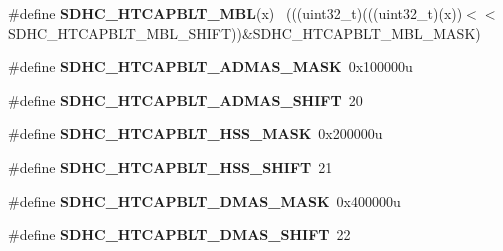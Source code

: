 \begin{DoxyCompactItemize}
\item 
\hypertarget{group___s_d_h_c___register___masks_ga6ce87788b2a2967c6a743dcd610498ba}{}\#define {\bfseries S\+D\+H\+C\+\_\+\+H\+T\+C\+A\+P\+B\+L\+T\+\_\+\+M\+B\+L}(x)                                      ~(((uint32\+\_\+t)(((uint32\+\_\+t)(x))$<$$<$S\+D\+H\+C\+\_\+\+H\+T\+C\+A\+P\+B\+L\+T\+\_\+\+M\+B\+L\+\_\+\+S\+H\+I\+F\+T))\&S\+D\+H\+C\+\_\+\+H\+T\+C\+A\+P\+B\+L\+T\+\_\+\+M\+B\+L\+\_\+\+M\+A\+S\+K)\label{group___s_d_h_c___register___masks_ga6ce87788b2a2967c6a743dcd610498ba}

\item 
\hypertarget{group___s_d_h_c___register___masks_gadb87583a1db8c53c61fdac8604e1ecc5}{}\#define {\bfseries S\+D\+H\+C\+\_\+\+H\+T\+C\+A\+P\+B\+L\+T\+\_\+\+A\+D\+M\+A\+S\+\_\+\+M\+A\+S\+K}~0x100000u\label{group___s_d_h_c___register___masks_gadb87583a1db8c53c61fdac8604e1ecc5}

\item 
\hypertarget{group___s_d_h_c___register___masks_ga6ceeb752d9ccad530b178fef829a9db6}{}\#define {\bfseries S\+D\+H\+C\+\_\+\+H\+T\+C\+A\+P\+B\+L\+T\+\_\+\+A\+D\+M\+A\+S\+\_\+\+S\+H\+I\+F\+T}~20\label{group___s_d_h_c___register___masks_ga6ceeb752d9ccad530b178fef829a9db6}

\item 
\hypertarget{group___s_d_h_c___register___masks_gabe87f7e9a2aa3b99012eaae8321aed89}{}\#define {\bfseries S\+D\+H\+C\+\_\+\+H\+T\+C\+A\+P\+B\+L\+T\+\_\+\+H\+S\+S\+\_\+\+M\+A\+S\+K}~0x200000u\label{group___s_d_h_c___register___masks_gabe87f7e9a2aa3b99012eaae8321aed89}

\item 
\hypertarget{group___s_d_h_c___register___masks_gae24b3d89ddf5bf4bf48ccc6fa948891d}{}\#define {\bfseries S\+D\+H\+C\+\_\+\+H\+T\+C\+A\+P\+B\+L\+T\+\_\+\+H\+S\+S\+\_\+\+S\+H\+I\+F\+T}~21\label{group___s_d_h_c___register___masks_gae24b3d89ddf5bf4bf48ccc6fa948891d}

\item 
\hypertarget{group___s_d_h_c___register___masks_ga5252cbd3675e74a01efa99cf6b754c8a}{}\#define {\bfseries S\+D\+H\+C\+\_\+\+H\+T\+C\+A\+P\+B\+L\+T\+\_\+\+D\+M\+A\+S\+\_\+\+M\+A\+S\+K}~0x400000u\label{group___s_d_h_c___register___masks_ga5252cbd3675e74a01efa99cf6b754c8a}

\item 
\hypertarget{group___s_d_h_c___register___masks_gab0236dd93e36239ae39f6b813eeb11a1}{}\#define {\bfseries S\+D\+H\+C\+\_\+\+H\+T\+C\+A\+P\+B\+L\+T\+\_\+\+D\+M\+A\+S\+\_\+\+S\+H\+I\+F\+T}~22\label{group___s_d_h_c___register___masks_gab0236dd93e36239ae39f6b813eeb11a1}


\end{DoxyCompactItemize}
